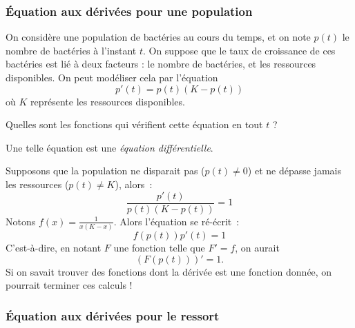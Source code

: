 \subsubsection{Équation aux dérivées pour une population}
\begin{frame}%
  \begin{question}
    On considère une population de bactéries au cours du temps, et on note \(p(t)\) le nombre de bactéries à l'instant \(t\).\pause{} On suppose que le taux de croissance de ces bactéries est lié à deux facteurs : le nombre de bactéries, et les ressources disponibles. On peut modéliser cela par l'équation
    \begin{equation*}
      p'(t) = p(t)(K - p(t))
    \end{equation*}
    où \(K\) représente les ressources disponibles.\pause{}

    Quelles sont les fonctions qui vérifient cette équation en tout \(t\) ?\pause{}
  \end{question}
  \begin{remark}
    Une telle équation est une \emph{équation différentielle}.
  \end{remark}
\end{frame}
\begin{frame}%
  \begin{answer}
    Supposons que la population ne disparait pas (\(p(t)\neq 0\)) et ne dépasse jamais les ressources (\(p(t)\neq K\)), alors~:\pause{}
    \begin{equation*}
      \frac{p'(t)}{p(t)(K-p(t))} = 1
    \end{equation*}\pause{}
    Notons \(f(x) = \frac{1}{x(K-x)}\). Alors l'équation se ré-écrit~:\pause{}
    \begin{equation*}
      f(p(t)) p'(t) = 1
    \end{equation*}\pause{}
    C'est-à-dire, en notant \(F\) une fonction telle que \(F' = f\), on aurait
    \begin{equation*}
      (F(p(t)))' = 1.
    \end{equation*}\pause{}
    Si on savait trouver des fonctions dont la dérivée est une fonction donnée, on pourrait terminer ces calculs !
  \end{answer}
\end{frame}

\subsubsection{Équation aux dérivées pour le ressort}

